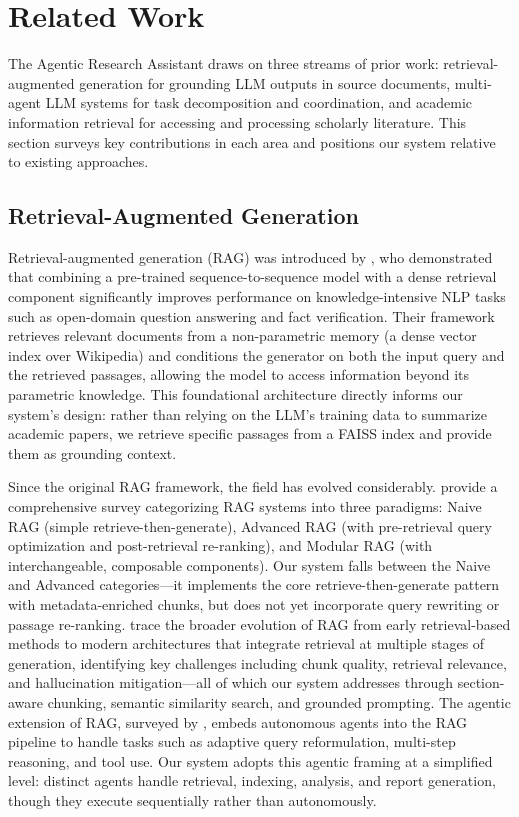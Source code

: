 \documentclass[12pt,a4paper]{article}
\begin{document}
\section{Related Work}
The Agentic Research Assistant draws on three streams of prior work: retrieval-augmented generation for grounding LLM outputs in source documents, multi-agent LLM systems for task decomposition and coordination, and academic information retrieval for accessing and processing scholarly literature. This section surveys key contributions in each area and positions our system relative to existing approaches.

\subsection{Retrieval-Augmented Generation}

Retrieval-augmented generation (RAG) was introduced by \citet{lewis2020rag}, who demonstrated that combining a pre-trained sequence-to-sequence model with a dense retrieval component significantly improves performance on knowledge-intensive NLP tasks such as open-domain question answering and fact verification. Their framework retrieves relevant documents from a non-parametric memory (a dense vector index over Wikipedia) and conditions the generator on both the input query and the retrieved passages, allowing the model to access information beyond its parametric knowledge. This foundational architecture directly informs our system's design: rather than relying on the LLM's training data to summarize academic papers, we retrieve specific passages from a FAISS index and provide them as grounding context.

Since the original RAG framework, the field has evolved considerably. \citet{gao2024ragsurvey} provide a comprehensive survey categorizing RAG systems into three paradigms: Naive RAG (simple retrieve-then-generate), Advanced RAG (with pre-retrieval query optimization and post-retrieval re-ranking), and Modular RAG (with interchangeable, composable components). Our system falls between the Naive and Advanced categories---it implements the core retrieve-then-generate pattern with metadata-enriched chunks, but does not yet incorporate query rewriting or passage re-ranking. \citet{gupta2024ragcomprehensive} trace the broader evolution of RAG from early retrieval-based methods to modern architectures that integrate retrieval at multiple stages of generation, identifying key challenges including chunk quality, retrieval relevance, and hallucination mitigation---all of which our system addresses through section-aware chunking, semantic similarity search, and grounded prompting. The agentic extension of RAG, surveyed by \citet{singh2025agenticrag}, embeds autonomous agents into the RAG pipeline to handle tasks such as adaptive query reformulation, multi-step reasoning, and tool use. Our system adopts this agentic framing at a simplified level: distinct agents handle retrieval, indexing, analysis, and report generation, though they execute sequentially rather than autonomously.
\end{document}
